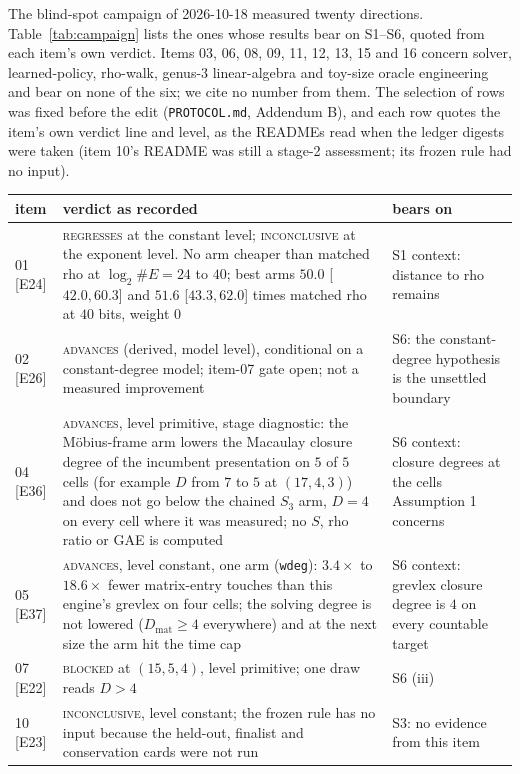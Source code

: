 \documentclass[10pt,a4paper]{article}
\newcommand{\ev}[1]{\textup{[#1]}}
\theoremstyle{definition}
\theoremstyle{remark}
\begin{document}
The blind-spot campaign of 2026-10-18 measured twenty directions. Table~\ref{tab:campaign}
lists the ones whose results bear on S1--S6, quoted from each item's own verdict. Items
03, 06, 08, 09, 11, 12, 13, 15 and 16 concern solver, learned-policy, rho-walk, genus-3 linear-algebra
and toy-size oracle engineering and bear on none of the six; we cite no number from them. The
selection of rows was fixed before the edit (\texttt{PROTOCOL.md}, Addendum B), and each row
quotes the item's own verdict line and level, as the READMEs read when the ledger digests were taken
(item 10's README was still a stage-2 assessment; its frozen rule had no input).

\begin{table}[t]
\centering\small
\begin{tabular}{@{}l p{6.6cm} p{4.3cm}@{}}
\toprule
item & verdict as recorded & bears on \\
\midrule
01 \ev{E24} & \textsc{regresses} at the constant level; \textsc{inconclusive} at the exponent level. No arm cheaper than matched rho at $\log_2\#E=24$ to $40$; best arms $50.0$ [$42.0,60.3$] and $51.6$ [$43.3,62.0$] times matched rho at $40$ bits, weight $0$ & S1 context: distance to rho remains \\
02 \ev{E26} & \textsc{advances} (derived, model level), conditional on a constant-degree model; item-07 gate open; not a measured improvement & S6: the constant-degree hypothesis is the unsettled boundary \\
04 \ev{E36} & \textsc{advances}, level primitive, stage diagnostic: the M\"obius-frame arm lowers the Macaulay closure degree of the incumbent presentation on $5$ of $5$ cells (for example $D$ from $7$ to $5$ at $(17,4,3)$) and does not go below the chained $S_3$ arm, $D=4$ on every cell where it was measured; no $S$, rho ratio or GAE is computed & S6 context: closure degrees at the cells Assumption 1 concerns \\
05 \ev{E37} & \textsc{advances}, level constant, one arm (\texttt{wdeg}): $3.4\times$ to $18.6\times$ fewer matrix-entry touches than this engine's grevlex on four cells; the solving degree is not lowered ($D_{\mathrm{mat}}\ge4$ everywhere) and at the next size the arm hit the time cap & S6 context: grevlex closure degree is $4$ on every countable target \\
07 \ev{E22} & \textsc{blocked} at $(15,5,4)$, level primitive; one draw reads $D>4$ & S6 (iii) \\
10 \ev{E23} & \textsc{inconclusive}, level constant; the frozen rule has no input because the held-out, finalist and conservation cards were not run & S3: no evidence from this item \\

\end{tabular}
\end{table}
\end{document}
